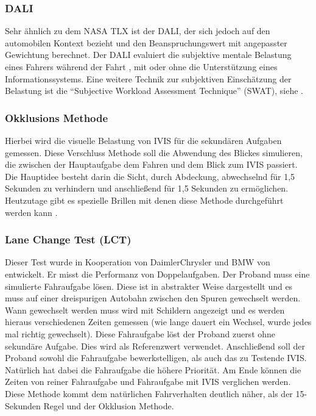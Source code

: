 \subsubsection{DALI}
Sehr ähnlich zu dem NASA TLX ist der DALI, der sich jedoch auf den automobilen Kontext bezieht und den Beanspruchungswert mit angepasster Gewichtung berechnet. 
Der DALI evaluiert die subjektive mentale Belastung eines Fahrers während der Fahrt \citep{pauzie2008method}, mit oder ohne die Unterstützung eines Informationssystems. 
Eine weitere Technik zur subjektiven Einschätzung der Belastung ist die "`Subjective Workload Assessment Technique"' (SWAT), siehe \citep{reid1982subjective}.

\subsubsection{Okklusions Methode}
Hierbei wird die visuelle Belastung von IVIS für die sekundären Aufgaben gemessen. 
Diese Verschluss Methode soll die Abwendung des Blickes simulieren, die zwischen der Hauptaufgabe dem Fahren und dem Blick zum IVIS passiert. 
Die Hauptidee besteht darin die Sicht, durch Abdeckung, abwechselnd für 1,5 Sekunden zu verhindern und anschließend für 1,5 Sekunden zu ermöglichen. 
Heutzutage gibt es spezielle Brillen mit denen diese Methode durchgeführt werden kann \citep{pettitt2006assessment}.

\subsubsection{Lane Change Test (LCT)}
Dieser Test wurde in Kooperation von DaimlerChrysler und BMW von \citet{mattes2003lane} entwickelt. 
Er misst die Performanz von Doppelaufgaben. 
Der Proband muss eine simulierte Fahraufgabe lösen. 
Diese ist in abstrakter Weise dargestellt und es muss auf einer dreispurigen Autobahn zwischen den Spuren gewechselt werden. 
Wann gewechselt werden muss wird mit Schildern angezeigt und es werden hieraus verschiedenen Zeiten gemessen (wie lange dauert ein Wechsel, wurde jedes mal richtig gewechselt). 
Diese Fahraufgabe löst der Proband zuerst ohne sekundäre Aufgabe.
Dies wird als Referenzwert verwendet. 
Anschließend soll der Proband sowohl die Fahraufgabe bewerkstelligen, als auch das zu Testende IVIS. 
Natürlich hat dabei die Fahraufgabe die höhere Priorität.  
Am Ende können die Zeiten von reiner Fahraufgabe und Fahraufgabe mit IVIS verglichen werden. 
Diese Methode kommt dem natürlichen Fahrverhalten deutlich näher, als der 15- Sekunden Regel und der Okklusion Methode.


